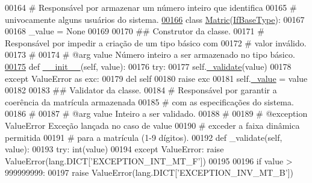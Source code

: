 \begin{DoxyCode}
00164 \textcolor{comment}{#   Responsável por armazenar um número inteiro que identifica}
00165 \textcolor{comment}{#   univocamente alguns usuários do sistema.}
\hypertarget{BaseUnit_8py_source_l00166}{}\hyperlink{classELO_1_1BaseUnit_1_1Matric}{00166} \textcolor{keyword}{class }\hyperlink{classELO_1_1BaseUnit_1_1Matric}{Matric}(\hyperlink{classELO_1_1BaseUnit_1_1IfBaseType}{IfBaseType}):
00167 
00168     \_value = \textcolor{keywordtype}{None}
00169 
00170     \textcolor{comment}{## Construtor da classe.}
00171     \textcolor{comment}{#   Responsável por impedir a criação de um tipo básico com}
00172     \textcolor{comment}{#   valor inválido.}
00173     \textcolor{comment}{#}
00174     \textcolor{comment}{#   @arg value Número inteiro a ser armazenado no tipo básico.}
\hypertarget{BaseUnit_8py_source_l00175}{}\hyperlink{classELO_1_1BaseUnit_1_1Matric_afc0a80bb206f5c6259901d9b817ec751}{00175}     \textcolor{keyword}{def }\hyperlink{classELO_1_1BaseUnit_1_1Matric_afc0a80bb206f5c6259901d9b817ec751}{\_\_init\_\_}(self, value):
00176         \textcolor{keywordflow}{try}:
00177             self.\hyperlink{classELO_1_1BaseUnit_1_1IfBaseType_acf84c5906a39b605a23ab68c4ca1dd19}{\_validate}(value)
00178         \textcolor{keywordflow}{except} ValueError \textcolor{keyword}{as} exc:
00179             del self
00180             \textcolor{keywordflow}{raise} exc
00181         self.\hyperlink{classELO_1_1BaseUnit_1_1IfBaseType_ad05d9d377fc4b99743c022cc8f6019d7}{\_value} = value
00182 
00183     \textcolor{comment}{## Validator da classe.}
00184     \textcolor{comment}{#   Responsável por garantir a coerência da matrícula armazenada}
00185     \textcolor{comment}{#   com as especificações do sistema.}
00186     \textcolor{comment}{#}
00187     \textcolor{comment}{#   @arg       value    Inteiro a ser validado.}
00188     \textcolor{comment}{#}
00189     \textcolor{comment}{#   @exception ValueError   Exceção lançada no caso de value}
00190     \textcolor{comment}{#                           exceder a faixa dinâmica permitida}
00191     \textcolor{comment}{#                           para a matrícula (1-9 dígitos).}
00192     \textcolor{keyword}{def }\_validate(self, value):
00193         \textcolor{keywordflow}{try}: int(value)
00194         \textcolor{keywordflow}{except} ValueError: \textcolor{keywordflow}{raise} ValueError(lang.DICT[\textcolor{stringliteral}{'EXCEPTION\_INT\_MT\_F'}])
00195 
00196         \textcolor{keywordflow}{if} value > 999999999:
00197             \textcolor{keywordflow}{raise} ValueError(lang.DICT[\textcolor{stringliteral}{'EXCEPTION\_INV\_MT\_B'}])

\end{DoxyCode}
